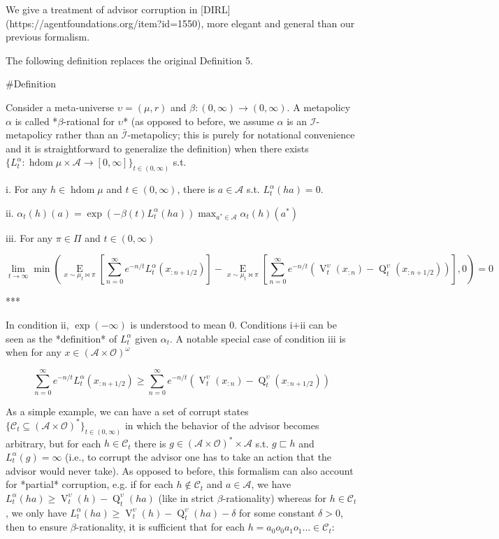 \documentclass[a4paper]{article}
\newcommand{\E}[1]{\underset{#1}{\operatorname{E}}}
\newcommand{\Ob}{\mathcal{O}}
\newcommand{\A}{\mathcal{A}}
\newcommand{\I}{\mathcal{I}}
\newcommand{\FH}{(\A \times \Ob)^*}
\newcommand{\IH}{(\A \times \Ob)^\omega}
\newcommand{\Adi}{{\bar{\I}}}
\DeclareMathOperator{\HD}{hdom}
\newcommand{\Co}{\mathcal{C}}
\newcommand{\V}{\operatorname{V}}
\newcommand{\Q}{\operatorname{Q}}
\begin{document}
We give a treatment of advisor corruption in [DIRL](https://agentfoundations.org/item?id=1550), more elegant and general than our previous formalism.

The following definition replaces the original Definition 5.

\#Definition

Consider a meta-universe $\upsilon=(\mu,r)$ and $\beta:(0,\infty)\rightarrow(0,\infty)$. A metapolicy $\alpha$ is called *$\beta$-rational for $\upsilon$* (as opposed to before, we assume $\alpha$ is an $\I$-metapolicy rather than an $\Adi$-metapolicy; this is purely for notational convenience and it is straightforward to generalize the definition) when there exists $\{L^\alpha_t: \HD{\mu} \times \A \rightarrow [0,\infty]\}_{t \in (0,\infty)}$ s.t.

i. For any $h \in \HD{\mu}$ and $t \in (0,\infty)$, there is $a \in \A$ s.t. $L^\alpha_t(ha)=0$.

ii. $\alpha_t(h)(a)=\exp(-\beta(t)L^\alpha_t(ha)) \max_{a^* \in \A} \alpha_t(h)(a^*)$

iii. For any $\pi \in \Pi$ and $t \in (0,\infty)$

$$\lim_{t \rightarrow \infty}\min(\E{x\sim\mu_t\bowtie\pi}[\sum_{n=0}^\infty e^{-n/t} L^\alpha_t(x_{:n+1/2})]-\E{x\sim\mu_t\bowtie\pi}[\sum_{n=0}^\infty e^{-n/t}(\V^\upsilon_t(x_{:n})-\Q^\upsilon_t(x_{:n+1/2}))],0)=0$$



***

In condition ii, $\exp(-\infty)$ is understood to mean 0. Conditions i+ii can be seen as the *definition* of $L^\alpha_t$ given $\alpha_t$. A notable special case of condition iii is when for any $x \in \IH$

$$\sum_{n=0}^\infty e^{-n/t} L^\alpha_t(x_{:n+1/2}) \geq \sum_{n=0}^\infty e^{-n/t}(\V^\upsilon_t(x_{:n})-\Q^\upsilon_t(x_{:n+1/2}))$$

As a simple example, we can have a set of corrupt states $\{\Co_t \subseteq \FH\}_{t\in(0,\infty)}$ in which the behavior of the advisor becomes arbitrary, but for each $h \in \Co_t$ there is $g \in \FH \times \A$  s.t. $g \sqsubset h$ and $L^\alpha_t(g)=\infty$ (i.e., to corrupt the advisor one has to take an action that the advisor would never take). As opposed to before, this formalism can also account for *partial* corruption, e.g. if for each $h \not\in \Co_t$ and $a \in \A$, we have $L^\alpha_t(ha) \geq \V^\upsilon_t(h) - \Q^\upsilon_t(ha)$ (like in strict $\beta$-rationality) whereas for $h \in \Co_t$, we only have $L^\alpha_t(ha) \geq \V^\upsilon_t(h) - \Q^\upsilon_t(ha) - \delta$ for some constant $\delta > 0$, then to ensure $\beta$-rationality, it is sufficient that for each $h = a_0o_0a_1o_1 \ldots \in \Co_t$:
\end{document}
